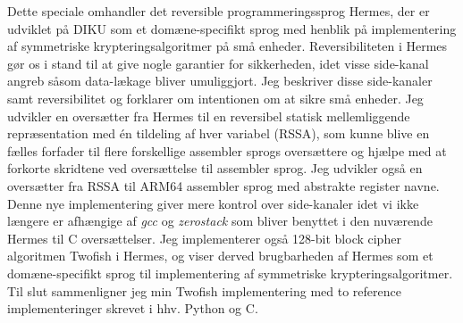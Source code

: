 Dette speciale omhandler det reversible programmeringssprog Hermes, der er udviklet på DIKU som et domæne-specifikt sprog med henblik på implementering af symmetriske krypteringsalgoritmer på små enheder.
Reversibiliteten i Hermes gør os i stand til at give nogle garantier for sikkerheden, idet visse side-kanal angreb såsom data-lækage bliver umuliggjort.
Jeg beskriver disse side-kanaler samt reversibilitet og forklarer om intentionen om at sikre små enheder.
Jeg udvikler en oversætter fra Hermes til en reversibel statisk mellemliggende repræsentation med én tildeling af hver variabel (RSSA), som kunne blive en fælles forfader til flere forskellige assembler sprogs oversættere og hjælpe med at forkorte skridtene ved oversættelse til assembler sprog.
Jeg udvikler også en oversætter fra RSSA til ARM64 assembler sprog med abstrakte register navne.
Denne nye implementering giver mere kontrol over side-kanaler idet vi ikke længere er afhængige af \emph{gcc} og \emph{zerostack} som bliver benyttet i den nuværende Hermes til C oversættelser.
Jeg implementerer også 128-bit block cipher algoritmen Twofish i Hermes, og viser derved brugbarheden af Hermes som et domæne-specifikt sprog til implementering af symmetriske krypteringsalgoritmer.
Til slut sammenligner jeg min Twofish implementering med to reference implementeringer skrevet i hhv. Python og C. 
